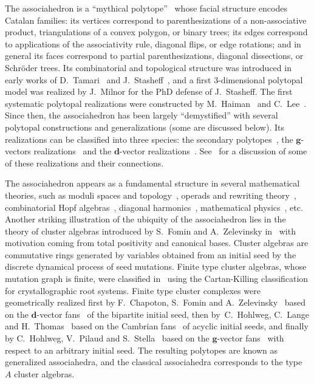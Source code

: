 \documentclass{amsart}
\theoremstyle{definition}
\renewcommand{\b}[1]{{\boldsymbol{#1}}} %
\begin{document}
The associahedron is a ``mythical polytope''~\cite{Haiman} whose facial structure encodes Catalan families: its vertices correspond to parenthesizations of a non-associative product, triangulations of a convex polygon, or binary trees; its edges correspond to applications of the associativity rule, diagonal flips, or edge rotations; and in general its faces correspond to partial parenthesizations, diagonal dissections, or Schr\"oder trees.
Its combinatorial and topological structure was introduced in early works of D.~Tamari~\cite{Tamari} and J.~Stasheff~\cite{Stasheff}, and a first $3$-dimensional polytopal model was realized by J.~Milnor for the PhD defense of J.~Stasheff.
The first systematic polytopal realizations were constructed by M.~Haiman~\cite{Haiman} and C.~Lee~\cite{Lee}.
Since then, the associahedron has been largely ``demystified'' with several polytopal constructions and generalizations (some are discussed below).
Its realizations can be classified into three species: the secondary polytopes~\cite{GelfandKapranovZelevinsky, BilleraFillimanSturmfels}, the $\b{g}$-vectors realizations~\cite{Loday, HohlwegLange, LangePilaud, HohlwegLangeThomas, HohlwegPilaudStella, Postnikov, PilaudSantos-brickPolytope, PilaudStump-brickPolytope} and the $\b{d}$-vector realizations~\cite{ChapotonFominZelevinsky, CeballosSantosZiegler}. See~\cite{CeballosSantosZiegler} for a discussion of some of these realizations and their connections.

The associahedron appears as a fundamental structure in several mathematical theories, such as moduli spaces and topology~\cite{Stasheff, Keller-AinfinityAlgebras}, operads and rewriting theory~\cite{Street, MasudaThomasTonksVallette}, combinatorial Hopf algebras~\cite{LodayRonco, ChatelPilaud, Pilaud-brickAlgebra}, diagonal harmonics~\cite{BergeronPrevilleRatelle, PrevilleRatelleViennot}, mathematical physics~\cite{ArkaniHamedBaiHeYan}, etc.
Another striking illustration of the ubiquity of the associahedron lies in the theory of cluster algebras introduced by S.~Fomin and A.~Zelevinsky in~\cite{FominZelevinsky-ClusterAlgebrasI} with motivation coming from total positivity and canonical bases.
Cluster algebras are commutative rings generated by variables obtained from an initial seed by the discrete dynamical process of seed mutations.
Finite type cluster algebras, whose mutation graph is finite, were classified in~\cite{FominZelevinsky-ClusterAlgebrasII} using the Cartan-Killing classification for crystallographic root systems.
Finite type cluster complexes were geometrically realized first by F.~Chapoton, S.~Fomin and A.~Zelevinsky~\cite{ChapotonFominZelevinsky} based on the $\b{d}$-vector fans~\cite{FominZelevinsky-YSystems, FominZelevinsky-ClusterAlgebrasII} of the bipartite initial seed, then by~C.~Hohlweg, C.~Lange and H.~Thomas~\cite{HohlwegLangeThomas} based on the Cambrian fans~\cite{Reading-CambrianLattices, ReadingSpeyer} of acyclic initial seeds, and finally by C.~Hohlweg, V.~Pilaud and S.~Stella~\cite{HohlwegPilaudStella} based on the $\b{g}$-vector fans~\cite{FominZelevinsky-ClusterAlgebrasIV} with respect to an arbitrary initial seed.
The resulting polytopes are known as generalized associahedra, and the classical associahedra corresponds to the type~$A$ cluster algebras.
\end{document}
